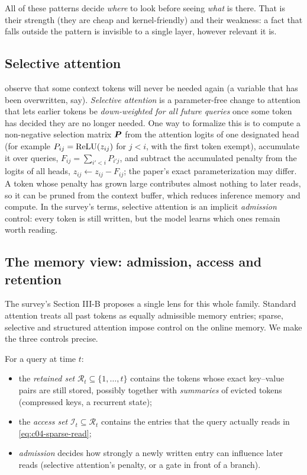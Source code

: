 All of these patterns decide \emph{where} to look before seeing \emph{what} is there. That is
their strength (they are cheap and kernel-friendly) and their weakness: a fact that falls outside
the pattern is invisible to a single layer, however relevant it is.

\subsection{Selective attention}\label{sec:c04-selective}

\citet{leviathan2024selective} observe that some context tokens will never be needed again (a
variable that has been overwritten, say). \emph{Selective attention} is a parameter-free change
to attention that lets earlier tokens be \emph{down-weighted for all future queries} once some
token has decided they are no longer needed. One way to formalize this is to compute a
non-negative selection matrix $\bm{P}$ from the attention logits of one designated head (for
example $P_{ij}=\operatorname{ReLU}(z_{ij})$ for $j<i$, with the first token exempt), accumulate it over
queries, $F_{ij}=\sum_{i'<i}P_{i'j}$, and subtract the accumulated penalty from the logits of
all heads, $z_{ij}\leftarrow z_{ij}-F_{ij}$; the paper's exact parameterization may differ. A
token whose penalty has grown large contributes almost nothing to later reads, so it can be
pruned from the context buffer, which reduces inference memory and compute. In the survey's
terms, selective attention is an implicit \emph{admission} control: every token is still
written, but the model learns which ones remain worth reading.

\subsection{The memory view: admission, access and retention}\label{sec:c04-memoryview}

The survey's Section III-B proposes a single lens for this whole family. Standard attention
treats all past tokens as equally admissible memory entries; sparse, selective and structured
attention impose control on the online memory. We make the three controls precise.

\begin{definition}\label{def:c04-controls}
For a query at time $t$:
\begin{itemize}
  \item the \emph{retained set} $\mathcal{R}_t\subseteq\{1,\dots,t\}$ contains the tokens whose
  exact key--value pairs are still stored, possibly together with \emph{summaries} of evicted
  tokens (compressed keys, a recurrent state);
  \item the \emph{access set} $\mathcal{I}_t\subseteq\mathcal{R}_t$ contains the entries that
  the query actually reads in \eqref{eq:c04-sparse-read};
  \item \emph{admission} decides how strongly a newly written entry can influence later reads
  (selective attention's penalty, or a gate in front of a branch).
\end{itemize}
\end{definition}


